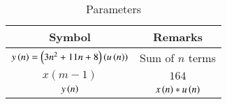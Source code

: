 \setlength{\arrayrulewidth}{0.3mm}
\setlength{\tabcolsep}{15pt}
\renewcommand{\arraystretch}{1.4}

\begin{table}[ht]
\centering

\begin{tabular}{|c|c|}
\hline

Symbol & Remarks\\
\hline
$y\left(n\right) =\left(3n^2+11n+8\right)\left(u\left(n\right)\right)$ & Sum of $n$ terms  \\
\hline
$x(m-1)$ & $164$\\
\hline
$y\left(n\right)$ & $x\left(n\right) * u\left(n\right)$\\
\hline

\end{tabular}
\vspace{0.25cm}
\caption{Parameters}
\label{tab:11.9.2.13.1}



\end{table}
